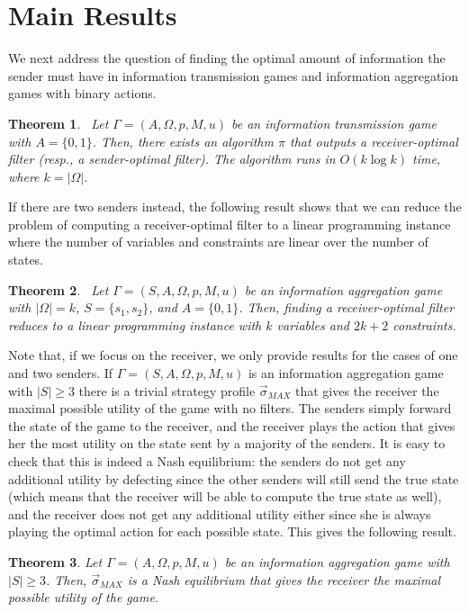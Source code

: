\documentclass[submission,copyright,creativecommons]{eptcs}
\newtheorem{theorem}{Theorem}
\begin{document}
\section{Main Results}\label{sec:results-filter}
We next address the question of finding the optimal amount of information the sender must have in information transmission games and information aggregation games with binary actions.
\begin{theorem}~\label{thm:binary-actions}
Let $\Gamma = (A, \Omega, p, M, u)$ be an information transmission game with $A = \{0,1\}$. Then, there exists an algorithm $\pi$ that outputs a receiver-optimal filter (resp., a sender-optimal filter). The algorithm runs in $O(k \log k)$ time, where $k = |\Omega|$.
\end{theorem}

If there are two senders instead, the following result shows that we can reduce the problem of computing a receiver-optimal filter to a linear programming instance where the number of variables and constraints are linear over the number of states.

\begin{theorem}~\label{thm:two-senders}
Let $\Gamma = (S, A, \Omega, p,M, u)$ be an information aggregation game with $|\Omega| = k$, $S = \{s_1, s_2\}$, and $A = \{0,1\}$. Then, finding a receiver-optimal filter reduces to a linear programming instance with $k$ variables and $2k+2$ constraints.
\end{theorem}

Note that, if we focus on the receiver, we only provide results for the cases of one and two senders. If $\Gamma = (S, A, \Omega, p, M, u)$ is an information aggregation game with $|S| \ge 3$ there is a trivial strategy profile $\vec{\sigma}_{MAX}$ that gives the receiver the maximal possible utility of the game with no filters. The senders simply forward the state of the game to the receiver, and the receiver plays the action that gives her the most utility on the state sent by a majority of the senders. It is easy to check that this is indeed a Nash equilibrium: the senders do not get any additional utility by defecting since the other senders will still send the true state (which means that the receiver will be able to compute the true state as well), and the receiver does not get any additional utility either since she is always playing the optimal action for each possible state. This gives the following result.

\begin{theorem}\label{thm:majority}
Let $\Gamma = (A, \Omega, p,M, u)$ be an information aggregation game with $|S| \ge 3$. Then, $\vec{\sigma}_{MAX}$ is a Nash equilibrium that gives the receiver the maximal possible utility of the game.
\end{theorem}
\end{document}
